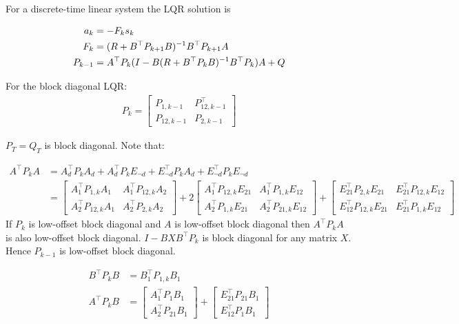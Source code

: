 \documentclass[]{article}
\begin{document}
For a discrete-time linear system the LQR solution is

\begin{align}
  a_k &= -F_ks_k
           \\
  F_k &= (R + B^\top P_{k+1}B)^{-1}B^\top P_{k+1}A
  \\
  P_{k-1} &= A^\top P_k( I - B(R + B^\top P_k B)^{-1}B^\top P_k) A + Q
\end{align}%
% 

For the block diagonal LQR:
\begin{align}
  P_k = \begin{bmatrix}
    P_{1,k-1} & P^\top_{12,k-1}
    \\
    P_{12,k-1} & P_{2,k-1}
    \end{bmatrix}
\end{align}

$P_T = Q_T$ is block diagonal.
Note that:

\begin{align}
  A^\top P_k A
               &= A_d^\top P_k A_d +  A_d^\top P_k E_{\neg d}
                 + E_{\neg d}^\top P_k A_d
                 + E_{\neg d}^\top P_k E_{\neg d}
  \\
  &= \begin{bmatrix}
    A_1^\top P_{1,k} A_1 & A_1^\top P_{12,k} A_2
    \\
    A_2^\top P_{12,k} A_1 & A_2^\top P_{2,k} A_2
    \end{bmatrix}
  + 2\begin{bmatrix}
    A_1^\top P_{12,k} E_{21} & A_1^\top P_{1,k} E_{12}
    \\
    A_2^\top P_{1,k} E_{21} & A_2^\top P_{21,k} E_{12}
    \end{bmatrix}
  + \begin{bmatrix}
    E_{21}^\top P_{2,k} E_{21} & E_{21}^\top P_{12,k} E_{12}
    \\
    E_{12}^\top P_{12,k} E_{21} & E_{21}^\top P_{1,k} E_{12}
    \end{bmatrix}
\end{align}
%
If $P_k$ is low-offset block diagonal and $A$ is low-offset block diagonal then
$A^\top P_k A$ is also low-offset block diagonal. $I - BXB^\top P_k$ is block
diagonal for any matrix $X$. Hence $P_{k-1}$ is low-offset block diagonal.

%
\begin{align}
  B^\top P_k B &= B_1^\top P_{1,k} B_1
  \\
  A^\top P_k B &=
  \begin{bmatrix}
    A_1^\top P_1 B_1
    \\
    A_2^\top P_{21} B_1
  \end{bmatrix}
  + \begin{bmatrix}
    E_{21}^\top P_{21} B_1
    \\
    E_{12}^\top P_1 B_1
  \end{bmatrix}
\end{align}%
% 
\end{document}
